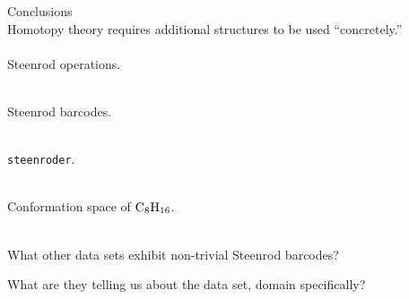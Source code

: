
\begin{frame}{Conclusions}
	\pause
	 \\
	Homotopy theory requires additional structures to be used ``concretely.'' \\

	\medskip\pause
	 \\
	Steenrod operations.

	\medskip\pause
	 \\
	Steenrod barcodes.

	\medskip\pause
	 \\
	\texttt{steenroder}.

	\medskip\pause
	 \\
	Conformation space of $\mathrm{C}_8\mathrm{H}_{16}$.

	\medskip\pause
	 \\
	\pause
	What other data sets exhibit non-trivial Steenrod barcodes?

	\smallskip\pause
	What are they telling us about the data set, domain specifically?

\end{frame}